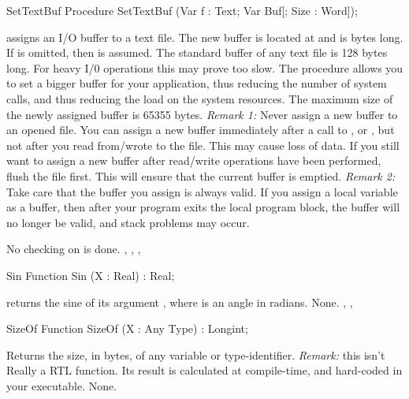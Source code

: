 \documentclass{report}
\begin{document}
\html{}

\begin{procedure}{SetTextBuf}
\Declaration
Procedure SetTextBuf (Var f : Text; Var Buf[; Size : Word]);

\Description
{} assigns an I/O buffer to a text file. The new buffer is
located at  and is  bytes long. If  is omitted,
then  is assumed.
The standard buffer of any text file is 128 bytes long. For heavy I/0
operations this may prove too slow. The  procedure allows
you to set a bigger buffer for your application, thus reducing the number of
system calls, and thus reducing the load on the system resources.
The maximum size of the newly assigned buffer is 65355 bytes.
{\em Remark 1:} Never assign a new buffer to an opened file. You can assign a
new buffer immediately after a call to ,  or
, but not after you read from/wrote to the file. This may cause
loss of data. If you still want to assign a new buffer after read/write
operations have been performed, flush the file first. This will ensure that
the current buffer is emptied.
{\em Remark 2:} Take care that the buffer you assign is always valid. If you
assign a local variable as a buffer, then after your program exits the local
program block, the buffer will no longer be valid, and stack problems may
occur.

\Errors
No checking on  is done.
\SeeAlso
{}, , , 
\end{procedure}
\html{}
\begin{function}{Sin}
\Declaration
Function Sin (X : Real) : Real;

\Description
{} returns the sine of its argument , where  is an
angle in radians.
\Errors
None.
\SeeAlso
{}, , 
\end{function}
\html{}
\begin{function}{SizeOf}
\Declaration
Function SizeOf (X : Any Type) : Longint;

\Description
{} Returns the size, in bytes, of any variable or type-identifier.
 {\em Remark:} this isn't Really a RTL function. Its result is calculated at
compile-time, and hard-coded in your executable.
\Errors
None.
\SeeAlso
{}
\end{function}
\end{document}

